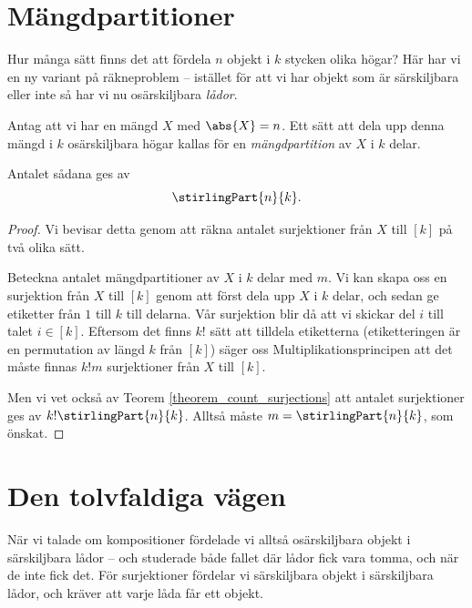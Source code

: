 \documentclass[nobib]{tufte-handout}
\begin{document}
\section{Mängdpartitioner}

Hur många sätt finns det att fördela $n$ objekt i $k$ stycken olika högar? Här har vi en ny variant på räkneproblem -- istället för att vi har objekt som är särskiljbara eller inte så har vi nu osärskiljbara \emph{lådor}.

\begin{theorem}
  Antag att vi har en mängd $X$ med $\abs{X} = n$. Ett sätt att dela upp denna mängd i $k$ osärskiljbara högar kallas för en \emph{mängdpartition} av $X$ i $k$ delar.

  Antalet sådana ges av
  $$\stirlingPart{n}{k}.$$

  \begin{proof}
    Vi bevisar detta genom att räkna antalet surjektioner från $X$ till $[k]$ på två olika sätt.

    Beteckna antalet mängdpartitioner av $X$ i $k$ delar med $m$. Vi kan skapa oss en surjektion från $X$ till $[k]$ genom att först dela upp $X$ i $k$ delar, och sedan ge etiketter från $1$ till $k$ till delarna. Vår surjektion blir då att vi skickar del $i$ till talet $i \in [k]$. Eftersom det finns $k!$ sätt att tilldela etiketterna (etiketteringen är en permutation av längd $k$ från $[k]$) säger oss Multiplikationsprincipen att det måste finnas $k!m$ surjektioner från $X$ till $[k]$.

    Men vi vet också av Teorem \ref{theorem_count_surjections} att antalet surjektioner ges av $k!\stirlingPart{n}{k}$. Alltså måste $m = \stirlingPart{n}{k}$, som önskat.
  \end{proof}
\end{theorem}

\section{Den tolvfaldiga vägen}

När vi talade om kompositioner fördelade vi alltså osärskiljbara objekt i särskiljbara lådor -- och studerade både fallet där lådor fick vara tomma, och när de inte fick det. För surjektioner fördelar vi särskiljbara objekt i särskiljbara lådor, och kräver att varje låda får ett objekt.
\end{document}
